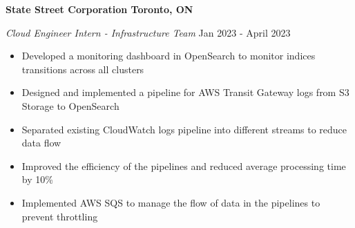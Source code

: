 \textbf{State Street Corporation \hfill Toronto, ON}\par
\textit{Cloud Engineer Intern - Infrastructure Team} \hfill Jan 2023 - April 2023

\begin{itemize}
  \item Developed a monitoring dashboard in OpenSearch to monitor indices transitions across all clusters
  \item Designed and implemented a pipeline for AWS Transit Gateway logs from S3 Storage to OpenSearch
  \item Separated existing CloudWatch logs pipeline into different streams to reduce data flow
  \item Improved the efficiency of the pipelines and reduced average processing time by 10\%
  \item Implemented AWS SQS to manage the flow of data in the pipelines to prevent throttling
\end{itemize}
\vspace{0.1cm} \par
